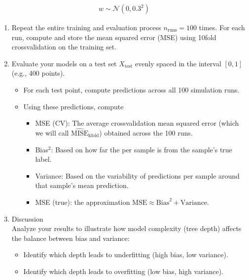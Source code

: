 \documentclass[letterpaper,10pt,english]{jupyterBook}
\begin{document}
\begin{equation*}
\begin{split}
w \sim \mathcal{N}(0, 0.3^2)
\end{split}
\end{equation*}\begin{enumerate}
%
\setcounter{enumi}{4}
\item {} 
\sphinxAtStartPar
Repeat the entire training and evaluation process \(n_{\text{runs}} = 100\) times. For each run, compute and store the mean squared error (MSE) using 10\sphinxhyphen{}fold cross\sphinxhyphen{}validation on the training set.

\item {} 
\sphinxAtStartPar
Evaluate your models on a test set \(X_{\text{test}}\) evenly spaced in the interval \([0,1]\) (e.g., 400 points).
\begin{itemize}
\item {} 
\sphinxAtStartPar
For each test point, compute predictions across all 100 simulation runs.

\item {} 
\sphinxAtStartPar
Using these predictions, compute
\begin{itemize}
\item {} 
\sphinxAtStartPar
MSE (CV): The average cross\sphinxhyphen{}validation mean squared error (which we will call \(\widehat{\text{MISE}}_{\text{kfold}}\)) obtained across the 100 runs.

\item {} 
\sphinxAtStartPar
Bias\(^2\): Based on how far the  per sample is from the sample’s true label.

\item {} 
\sphinxAtStartPar
Variance: Based on the variability of predictions per sample around that sample’s mean prediction.

\item {} 
\sphinxAtStartPar
MSE (true): the approximation \(
\text{MSE} \approx \text{Bias}^2 + \text{Variance}.\)

\end{itemize}

\end{itemize}

\item {} 
\sphinxAtStartPar
Discussion\\
Analyze your results to illustrate how model complexity (tree depth) affects the balance between bias and variance:
\begin{itemize}
\item {} 
\sphinxAtStartPar
Identify which depth leads to underfitting (high bias, low variance).

\item {} 
\sphinxAtStartPar
Identify which depth leads to overfitting (low bias, high variance).

\end{itemize}

\end{enumerate}
\end{document}
